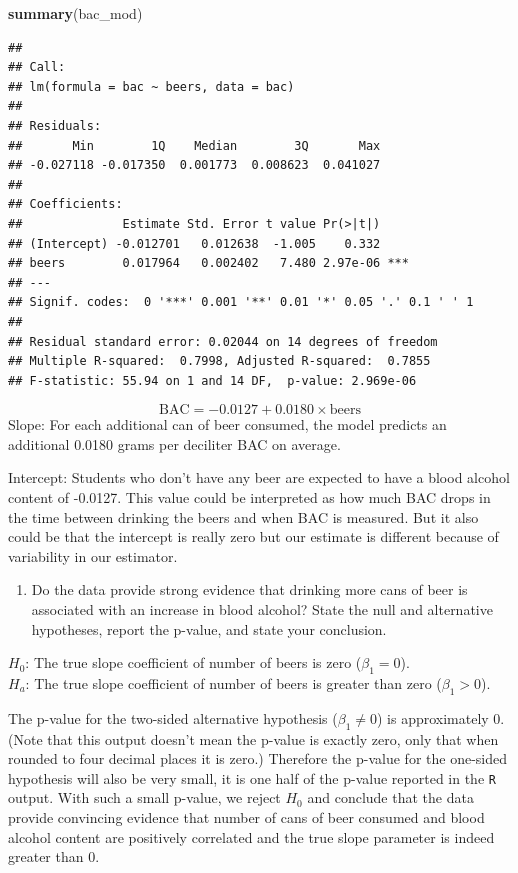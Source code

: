 \documentclass[
]{book}
\newenvironment{Shaded}{\begin{snugshade}}{\end{snugshade}}
\newcommand{\KeywordTok}[1]{\textcolor[rgb]{0.13,0.29,0.53}{\textbf{#1}}}
\newcommand{\NormalTok}[1]{#1}
\providecommand{\tightlist}{%
  \setlength{\itemsep}{0pt}\setlength{\parskip}{0pt}}
\begin{document}
\begin{Shaded}
\begin{Highlighting}[]
\KeywordTok{summary}\NormalTok{(bac_mod)}
\end{Highlighting}
\end{Shaded}

\begin{verbatim}
## 
## Call:
## lm(formula = bac ~ beers, data = bac)
## 
## Residuals:
##       Min        1Q    Median        3Q       Max 
## -0.027118 -0.017350  0.001773  0.008623  0.041027 
## 
## Coefficients:
##              Estimate Std. Error t value Pr(>|t|)    
## (Intercept) -0.012701   0.012638  -1.005    0.332    
## beers        0.017964   0.002402   7.480 2.97e-06 ***
## ---
## Signif. codes:  0 '***' 0.001 '**' 0.01 '*' 0.05 '.' 0.1 ' ' 1
## 
## Residual standard error: 0.02044 on 14 degrees of freedom
## Multiple R-squared:  0.7998, Adjusted R-squared:  0.7855 
## F-statistic: 55.94 on 1 and 14 DF,  p-value: 2.969e-06
\end{verbatim}

\[\text{BAC} = -0.0127 + 0.0180 \times \text{beers} \]
Slope: For each additional can of beer consumed, the model predicts an additional 0.0180 grams per deciliter BAC on average.

Intercept: Students who don't have any beer are expected to have a blood alcohol content of -0.0127. This value could be interpreted as how much BAC drops in the time between drinking the beers and when BAC is measured. But it also could be that the intercept is really zero but our estimate is different because of variability in our estimator.

\begin{enumerate}
\def\labelenumi{\alph{enumi}.}
\setcounter{enumi}{3}
\tightlist
\item
  Do the data provide strong evidence that drinking more cans of beer is associated with an increase in blood alcohol? State the null and alternative hypotheses, report the p-value, and state your conclusion.
\end{enumerate}

\(H_0\): The true slope coefficient of number of beers is zero (\(\beta_1 = 0\)).\\
\(H_a\): The true slope coefficient of number of beers is greater than zero (\(\beta_1 > 0\)).

The p-value for the two-sided alternative hypothesis (\(\beta_1 \neq 0\)) is approximately 0. (Note that this output doesn't mean the p-value is exactly zero, only that when rounded to four decimal places it is zero.) Therefore the p-value for the one-sided hypothesis will also be very small, it is one half of the p-value reported in the \texttt{R} output. With such a small p-value, we reject \(H_0\) and conclude that the data provide convincing evidence that number of cans of beer consumed and blood alcohol content are positively correlated and the true slope parameter is indeed greater than 0.
\end{document}
